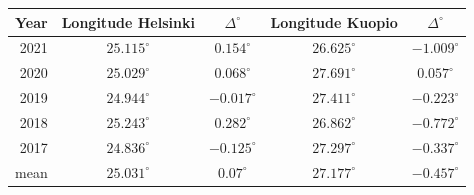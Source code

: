 


\begin{table}%
\centering
\begin{tabular}{r|c|c|c|c} \hline\hline

 Year & Longitude Helsinki & $\Delta^\circ$  & Longitude Kuopio & $\Delta^\circ$ \\ \hline
 2021 & $25.115^\circ$  & $0.154^\circ $  & $26.625^\circ$ & $-1.009^\circ $ \\
 2020 & $25.029^\circ$ & $0.068^\circ $& $27.691^\circ$  & $0.057^\circ $ \\
 2019 & $24.944^\circ$ & $-0.017^\circ $& $27.411^\circ$ & $-0.223^\circ $  \\
 2018 & $25.243^\circ$ & $0.282^\circ $& $26.862^\circ$ & $-0.772^\circ $ \\
 2017 & $24.836^\circ$  & $-0.125^\circ $& $27.297^\circ$ & $-0.337^\circ $ \\
 mean & $25.031^\circ$  & $0.07^\circ $& $27.177^\circ$ & $-0.457^\circ $ \\
\hline\hline
\end{tabular}
\label{table_geolocator_results}
\end{table}

\newpage

